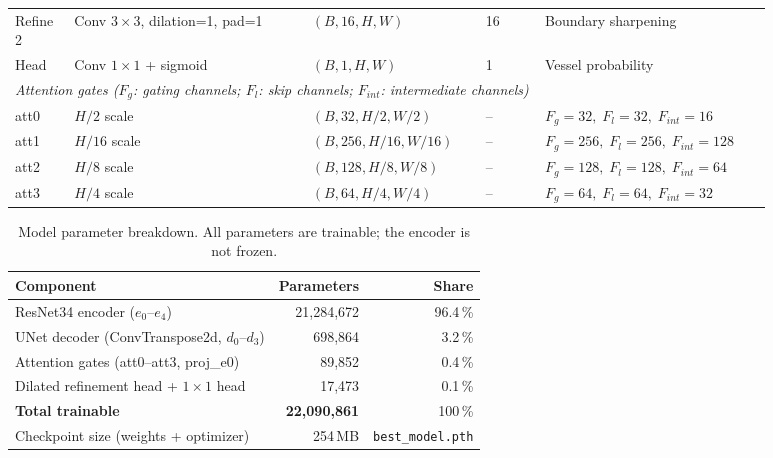 \documentclass[11pt,letterpaper]{article}
\begin{document}
\begin{table}[htbp]
\begin{tabular}{p{0.07\linewidth}p{0.28\linewidth}p{0.20\linewidth}p{0.07\linewidth}p{0.26\linewidth}}
Refine 2 & Conv $3{\times}3$, dilation=1, pad=1 & $(B,16,H,W)$ & 16 & Boundary sharpening \\
Head & Conv $1{\times}1$ + sigmoid & $(B,1,H,W)$ & 1 & Vessel probability \\
\midrule
\multicolumn{5}{l}{\textit{Attention gates ($F_g$: gating channels; $F_l$: skip channels; $F_{int}$: intermediate channels)}} \\
att0 & $H/2$ scale & $(B,32,H/2,W/2)$ & -- & $F_g{=}32,\;F_l{=}32,\;F_{int}{=}16$ \\
att1 & $H/16$ scale & $(B,256,H/16,W/16)$ & -- & $F_g{=}256,\;F_l{=}256,\;F_{int}{=}128$ \\
att2 & $H/8$ scale & $(B,128,H/8,W/8)$ & -- & $F_g{=}128,\;F_l{=}128,\;F_{int}{=}64$ \\
att3 & $H/4$ scale & $(B,64,H/4,W/4)$ & -- & $F_g{=}64,\;F_l{=}64,\;F_{int}{=}32$ \\
\bottomrule
\end{tabular}
\label{tab:architecture}
\end{table}

\begin{table}[htbp]
\centering
\caption{Model parameter breakdown. All parameters are trainable; the encoder is not frozen.}
\begin{tabular}{lrr}
\toprule
Component & Parameters & Share \\
\midrule
ResNet34 encoder ($e_0$--$e_4$) & 21,284,672 & 96.4\,\% \\
UNet decoder (ConvTranspose2d, $d_0$--$d_3$) & 698,864 & 3.2\,\% \\
Attention gates (att0--att3, proj\_e0) & 89,852 & 0.4\,\% \\
Dilated refinement head + $1{\times}1$ head & 17,473 & 0.1\,\% \\
\midrule
\textbf{Total trainable} & \textbf{22,090,861} & 100\,\% \\
Checkpoint size (weights + optimizer) & 254\,MB & \texttt{best\_model.pth} \\
\bottomrule
\end{tabular}
\label{tab:model-params}
\end{table}
\end{document}
